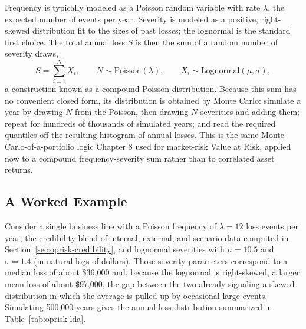 \documentclass[../ai_in_finance]{subfiles}
\begin{document}
Frequency is typically modeled as a Poisson random variable with rate $\lambda$, the expected number of events per year. Severity is modeled as a positive, right-skewed distribution fit to the sizes of past losses; the lognormal is the standard first choice. The total annual loss $S$ is then the sum of a random number of severity draws,
\begin{equation*}
S = \sum_{i=1}^{N} X_i, \qquad N \sim \text{Poisson}(\lambda), \qquad X_i \sim \text{Lognormal}(\mu, \sigma),
\end{equation*}
a construction known as a compound Poisson distribution. Because this sum has no convenient closed form, its distribution is obtained by Monte Carlo: simulate a year by drawing $N$ from the Poisson, then drawing $N$ severities and adding them; repeat for hundreds of thousands of simulated years; and read the required quantiles off the resulting histogram of annual losses. This is the same Monte-Carlo-of-a-portfolio logic Chapter 8 used for market-risk Value at Risk, applied now to a compound frequency-severity sum rather than to correlated asset returns.

\subsection{A Worked Example}
\label{sec:oprisk-lda-worked}

Consider a single business line with a Poisson frequency of $\lambda = 12$ loss events per year, the credibility blend of internal, external, and scenario data computed in Section~\ref{sec:oprisk-credibility}, and lognormal severities with $\mu = 10.5$ and $\sigma = 1.4$ (in natural logs of dollars). Those severity parameters correspond to a median loss of about \$36{,}000 and, because the lognormal is right-skewed, a larger mean loss of about \$97{,}000, the gap between the two already signaling a skewed distribution in which the average is pulled up by occasional large events. Simulating 500{,}000 years gives the annual-loss distribution summarized in Table~\ref{tab:oprisk-lda}.
\end{document}
